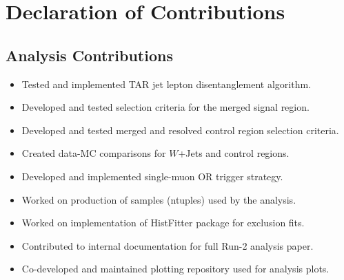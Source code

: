 \newpage
{}

\chapter*{Declaration of Contributions}
\section*{Analysis Contributions}
\begin{itemize}
\item Tested and implemented TAR jet lepton disentanglement algorithm.
\item Developed and tested selection criteria for the merged signal region.
\item Developed and tested merged and resolved \ttbar control region selection criteria.
\item Created data-MC comparisons for $W$+Jets and \ttbar control regions.
\item Developed and implemented single-muon OR \met trigger strategy.
\item Worked on production of samples (ntuples) used by the analysis.
\item Worked on implementation of HistFitter package for exclusion fits.
\item Contributed to internal documentation for full Run-2 analysis paper.
\item Co-developed and maintained plotting repository used for analysis plots.
\end{itemize}
